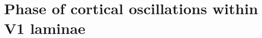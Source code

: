 \chapter{Phase of cortical oscillations within V1 laminae}
\label{ch:plam}

\graphicspath{{Chapters/laminar-phase/figs/}}

